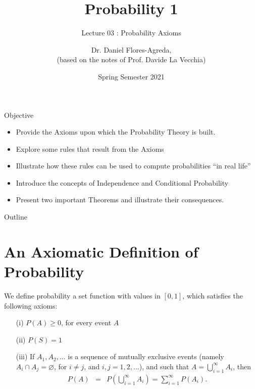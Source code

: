 \documentclass[notes=show, handout]{beamer}\usepackage[]{graphicx}\usepackage[]{color}
\newcommand{\bea}{\begin{eqnarray}}
\newcommand{\eea}{\end{eqnarray}}
\begin{document}
\title[S110015]{Probability 1}
\subtitle{Lecture 03 : Probability Axioms}
\author[Flores-Agreda, La Vecchia]{Dr. Daniel Flores-Agreda, \\[0.5em] \tiny{(based on the notes of Prof. Davide La Vecchia)}}
\date{Spring Semester 2021}

\begin{frame}
  \titlepage
\end{frame}

\begin{frame}{Objective}
  \begin{itemize}
  \item Provide the Axioms upon which the Probability Theory is built.
  \item Explore some rules that result from the Axioms
  \item Illustrate how these rules can be used to compute probabilities ``in real life''
  \item Introduce the concepts of Independence and Conditional Probability
  \item Present two important Theorems and illustrate their consequences.
  \end{itemize}
\end{frame}

\begin{frame}{Outline}
\tableofcontents
\end{frame}

\section{An Axiomatic Definition of Probability}

\begin{frame}{\secname}
  \begin{definition}
  We define probability a set function with values in $[0,1]$, which
  satisfies the following axioms:
  \begin{itemize}
  \item[ (i)] $P(A) \geq 0$, for every event $A$
  \item[ (ii)] $P(S)=1$
  \item[ (iii)] If $A_1,A_2,...$ is a sequence of mutually exclusive events (namely \color{red}$A_i \cap A_j =\varnothing$, for $i \neq j$, and $i,j=1,2,...$\color{black}),
  and such that
  $A = \bigcup_{i=1}^{\infty} A_i$, then
  \bea
  \label{Eq: additivity}
  P(A) &=& P\left(  \bigcup_{i=1}^\infty A_i \right) = \sum_{i=1}^{\infty} P(A_i).
  \eea
  \end{itemize}
  \end{definition}
\end{frame}
\end{document}
